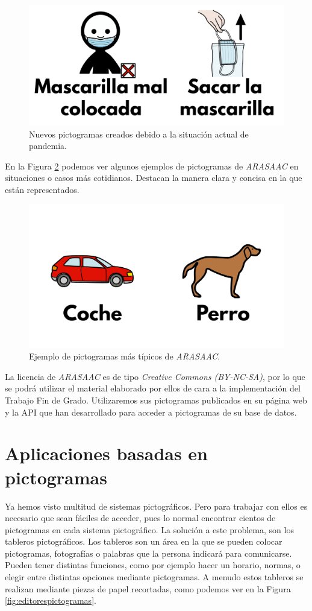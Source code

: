 \begin{figure}[h!]
	\centering
	\includegraphics[width=0.5\linewidth]{Imagenes/Bitmap/ejemplosdepictos}
	\caption{Nuevos pictogramas creados debido a la situación actual de pandemia. }
	\label{fig:ejemplosdepictos}
\end{figure}




En la Figura \ref{fig:arasaacpictos} podemos ver algunos ejemplos de pictogramas de \textit{ARASAAC} en situaciones o casos más cotidianos. Destacan la manera clara y concisa en la que están representados. 

\begin{figure}[h!]
	\centering
	\includegraphics[width=0.5\linewidth]{Imagenes/Bitmap/ARASAACPictos}
	\caption{Ejemplo de pictogramas más típicos de \textit{ARASAAC}.}
	\label{fig:arasaacpictos}
\end{figure}

La licencia de \textit{ARASAAC} es de tipo \textit{Creative Commons (BY-NC-SA)}, por lo que se podrá utilizar el material elaborado por ellos de cara a la implementación del Trabajo Fin de Grado. Utilizaremos sus pictogramas publicados en su página web y la API que han desarrollado para acceder a pictogramas de su base de datos.

\section{Aplicaciones basadas en pictogramas}
\label{cap3:sec:editor-tableros}

Ya hemos visto multitud de sistemas pictográficos. Pero para trabajar con ellos es necesario que sean fáciles de acceder, pues lo normal encontrar cientos de pictogramas en cada sistema pictográfico. La solución a este problema, son los tableros pictográficos. Los tableros son un área en la que se pueden colocar pictogramas, fotografías o palabras que la persona indicará para comunicarse. Pueden tener distintas funciones, como por ejemplo hacer un horario, normas, o elegir entre distintas opciones mediante pictogramas. A menudo estos tableros se realizan mediante piezas de papel recortadas, como podemos ver en la Figura \ref{fig:editorespictogramas}.

